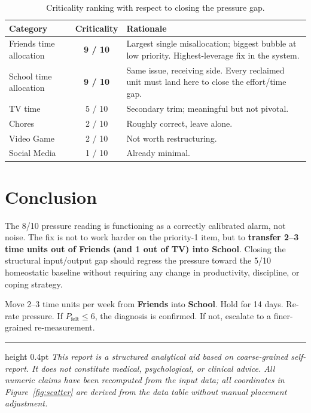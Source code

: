 \documentclass[11pt,a4paper]{article}
\begin{document}
\begin{table}[h]
\centering
\renewcommand{\arraystretch}{1.25}
\begin{tabular}{l c >{\raggedright\arraybackslash}p{8.5cm}}
\toprule
\textbf{Category} & \textbf{Criticality} & \textbf{Rationale} \\
\midrule
Friends time allocation & \textcolor{accent2}{\textbf{9 / 10}} & Largest single misallocation; biggest bubble at low priority. Highest-leverage fix in the system. \\
School time allocation  & \textcolor{accent2}{\textbf{9 / 10}} & Same issue, receiving side. Every reclaimed unit must land here to close the effort/time gap. \\
TV time                 & 5 / 10 & Secondary trim; meaningful but not pivotal. \\
Chores                  & 2 / 10 & Roughly correct, leave alone. \\
Video Game              & 2 / 10 & Not worth restructuring. \\
Social Media            & 1 / 10 & Already minimal. \\
\bottomrule
\end{tabular}
\caption{Criticality ranking with respect to closing the pressure gap.}
\label{tab:crit}
\end{table}

\section{Conclusion}

The 8/10 pressure reading is functioning as a correctly calibrated alarm, not noise. The fix is not to work harder on the priority-1 item, but to \textbf{transfer 2--3 time units out of Friends (and 1 out of TV) into School}. Closing the structural input/output gap should regress the pressure toward the 5/10 homeostatic baseline without requiring any change in productivity, discipline, or coping strategy.

\begin{keybox}
Move 2--3 time units per week from \textbf{Friends} into \textbf{School}. Hold for 14 days. Re-rate pressure. If $P_\text{felt} \leq 6$, the diagnosis is confirmed. If not, escalate to a finer-grained re-measurement.
\end{keybox}

\vspace{1em}
\hrule height 0.4pt
\vspace{0.4em}
{\small\color{rule}\textit{This report is a structured analytical aid based on coarse-grained self-report. It does not constitute medical, psychological, or clinical advice. All numeric claims have been recomputed from the input data; all coordinates in Figure~\ref{fig:scatter} are derived from the data table without manual placement adjustment.}}
\end{document}
